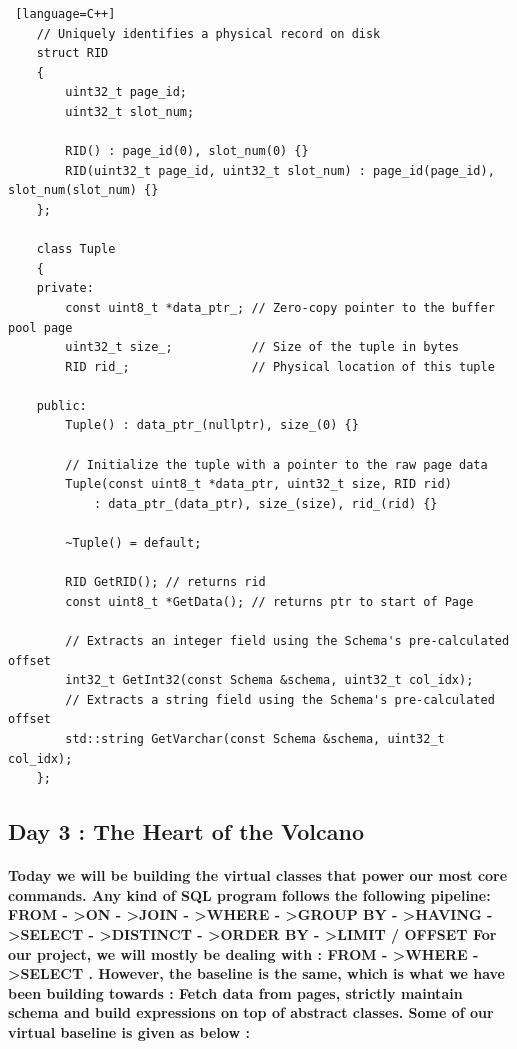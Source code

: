 \documentclass{article}
\begin{document}
\begin{lstlisting} [language=C++]
    // Uniquely identifies a physical record on disk
    struct RID
    {
        uint32_t page_id;
        uint32_t slot_num;

        RID() : page_id(0), slot_num(0) {}
        RID(uint32_t page_id, uint32_t slot_num) : page_id(page_id), slot_num(slot_num) {}
    };

    class Tuple
    {
    private:
        const uint8_t *data_ptr_; // Zero-copy pointer to the buffer pool page
        uint32_t size_;           // Size of the tuple in bytes
        RID rid_;                 // Physical location of this tuple

    public:
        Tuple() : data_ptr_(nullptr), size_(0) {}

        // Initialize the tuple with a pointer to the raw page data
        Tuple(const uint8_t *data_ptr, uint32_t size, RID rid)
            : data_ptr_(data_ptr), size_(size), rid_(rid) {}

        ~Tuple() = default;

        RID GetRID(); // returns rid
        const uint8_t *GetData(); // returns ptr to start of Page

        // Extracts an integer field using the Schema's pre-calculated offset
        int32_t GetInt32(const Schema &schema, uint32_t col_idx);
        // Extracts a string field using the Schema's pre-calculated offset
        std::string GetVarchar(const Schema &schema, uint32_t col_idx);
    };
\end{lstlisting}

\newpage
\subsection{Day 3 : The Heart of the Volcano}

\paragraph{
    Today we will be building the virtual classes that power our most core commands.
    Any kind of SQL program follows the following pipeline: \newline
    FROM - \textgreater ON - \textgreater JOIN - \textgreater WHERE - \textgreater GROUP BY - \textgreater HAVING - \textgreater SELECT - \textgreater DISTINCT - \textgreater ORDER BY - \textgreater LIMIT / OFFSET
    \newline For our project, we will mostly be dealing with :
    \newline FROM - \textgreater WHERE - \textgreater SELECT .
    \newline However, the baseline is the same, which is what we have been building towards :
    Fetch data from pages, strictly maintain schema and build expressions on top of abstract classes.
    Some of our virtual baseline is given as below :
} \mbox{} \\
\end{document}
